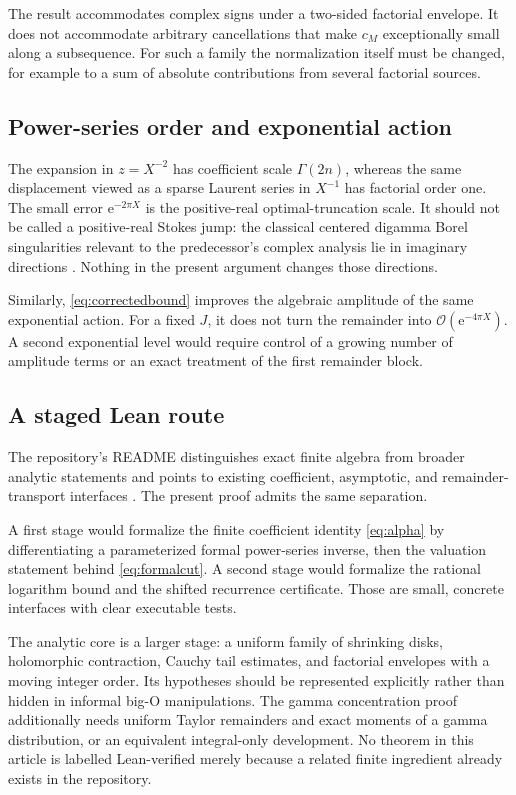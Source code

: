 \documentclass[11pt,a4paper]{article}
\theoremstyle{definition}
\numberwithin{equation}{section}
\newcommand{\e}{\mathrm e}
\newcommand{\Oh}{\mathcal O}
\begin{document}
The result accommodates complex signs under a two-sided factorial envelope. It does not accommodate arbitrary cancellations that make $c_M$ exceptionally small along a subsequence. For such a family the normalization itself must be changed, for example to a sum of absolute contributions from several factorial sources.

\subsection{Power-series order and exponential action}
The expansion in $z=X^{-2}$ has coefficient scale $\Gamma(2n)$, whereas the same displacement viewed as a sparse Laurent series in $X^{-1}$ has factorial order one. The small error $\e^{-2\pi X}$ is the positive-real optimal-truncation scale. It should not be called a positive-real Stokes jump: the classical centered digamma Borel singularities relevant to the predecessor's complex analysis lie in imaginary directions \cite{prior,dlmf}. Nothing in the present argument changes those directions.

Similarly, \eqref{eq:correctedbound} improves the algebraic amplitude of the same exponential action. For a fixed $J$, it does not turn the remainder into $\Oh(\e^{-4\pi X})$. A second exponential level would require control of a growing number of amplitude terms or an exact treatment of the first remainder block.

\subsection{A staged Lean route}
The repository's README distinguishes exact finite algebra from broader analytic statements and points to existing coefficient, asymptotic, and remainder-transport interfaces \cite{group,canonical}. The present proof admits the same separation.

A first stage would formalize the finite coefficient identity \eqref{eq:alpha} by differentiating a parameterized formal power-series inverse, then the valuation statement behind \eqref{eq:formalcut}. A second stage would formalize the rational logarithm bound and the shifted recurrence certificate. Those are small, concrete interfaces with clear executable tests.

The analytic core is a larger stage: a uniform family of shrinking disks, holomorphic contraction, Cauchy tail estimates, and factorial envelopes with a moving integer order. Its hypotheses should be represented explicitly rather than hidden in informal big-O manipulations. The gamma concentration proof additionally needs uniform Taylor remainders and exact moments of a gamma distribution, or an equivalent integral-only development. No theorem in this article is labelled Lean-verified merely because a related finite ingredient already exists in the repository.
\end{document}
